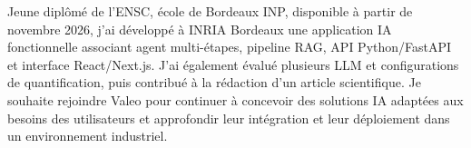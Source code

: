 
\begin{cvparagraph}
Jeune diplômé de l’ENSC, école de Bordeaux INP, disponible à partir de novembre 2026, j’ai développé à INRIA Bordeaux une application IA fonctionnelle associant agent multi-étapes, pipeline RAG, API Python/FastAPI et interface React/Next.js. J’ai également évalué plusieurs LLM et configurations de quantification, puis contribué à la rédaction d’un article scientifique. Je souhaite rejoindre Valeo pour continuer à concevoir des solutions IA adaptées aux besoins des utilisateurs et approfondir leur intégration et leur déploiement dans un environnement industriel.
\end{cvparagraph}
